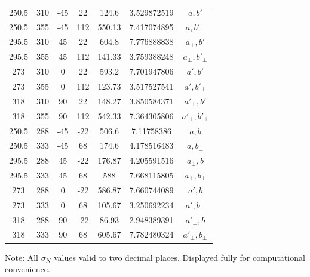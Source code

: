 \documentclass{article}
\begin{document}
\begin{table}[H]
{\begin{tabular}{ccccccc}
    250.5 & 310 & -45 & 22 & 124.6 & 3.529872519 & $a,b'$ \\
    250.5 & 355 & -45 & 112 & 550.13 & 7.417074895 & $a,b'_{\bot}$ \\
    295.5 & 310 & 45 & 22 & 604.8 & 7.776888838 & $a_{\bot},b'$ \\
    295.5 & 355 & 45 & 112 & 141.33 & 3.759388248 & $a_{\bot},b'_{\bot}$ \\
    273 & 310 & 0 & 22 & 593.2 & 7.701947806 & $a',b'$ \\
    273 & 355 & 0 & 112 & 123.73 & 3.517527541 & $a',b'_{\bot}$ \\
    318 & 310 & 90 & 22 & 148.27 & 3.850584371 & $a'_{\bot},b'$ \\
    318 & 355 & 90 & 112 & 542.33 & 7.364305806 & $a'_{\bot},b'_{\bot}$ \\
    250.5 & 288 & -45 & -22 & 506.6 & 7.11758386 & $a,b$ \\
    250.5 & 333 & -45 & 68 & 174.6 & 4.178516483 & $a,b_{\bot}$ \\
    295.5 & 288 & 45 & -22 & 176.87 & 4.205591516 & $a_{\bot},b$ \\
    295.5 & 333 & 45 & 68 & 588 & 7.668115805 & $a_{\bot},b_{\bot}$ \\
    273 & 288 & 0 & -22 & 586.87 & 7.660744089 & $a',b$ \\
    273 & 333 & 0 & 68 & 105.67 & 3.250692234 & $a',b_{\bot}$ \\
    318 & 288 & 90 & -22 & 86.93 & 2.948389391 & $a'_{\bot},b$ \\
    318 & 333 & 90 & 68 & 605.67 & 7.782480324 & $a'_{\bot},b_{\bot}$
    \end{tabular}}
    \end{table}
    
Note: All $\sigma_N$ values valid to two decimal places. Displayed fully for computational convenience.
\end{document}
